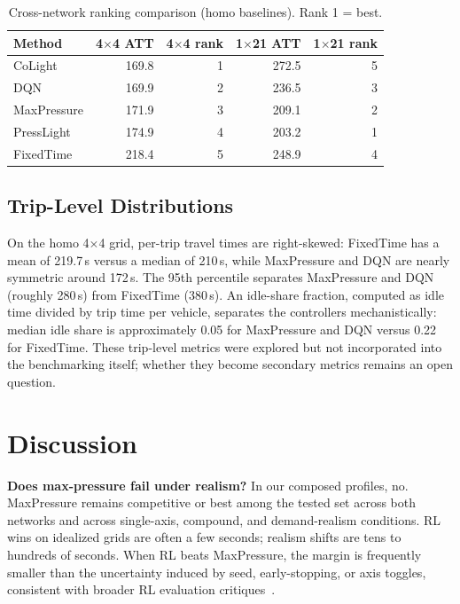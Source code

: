 \documentclass[conference]{IEEEtran}
\begin{document}
\begin{table}[t]
\centering
\caption{Cross-network ranking comparison (homo baselines). Rank 1 = best.}
\label{tab:crossnet}
\setlength{\tabcolsep}{4pt}
\begin{tabular}{lrrrr}
\toprule
Method & 4$\times$4 ATT & 4$\times$4 rank & 1$\times$21 ATT & 1$\times$21 rank \\
\midrule
CoLight     & 169.8 & 1 & 272.5 & 5 \\
DQN         & 169.9 & 2 & 236.5 & 3 \\
MaxPressure & 171.9 & 3 & 209.1 & 2 \\
PressLight  & 174.9 & 4 & 203.2 & 1 \\
FixedTime   & 218.4 & 5 & 248.9 & 4 \\
\bottomrule
\end{tabular}
\end{table}

\subsection{Trip-Level Distributions}

On the homo 4$\times$4 grid, per-trip travel times are right-skewed: FixedTime has a mean of 219.7\,s versus a median of 210\,s, while MaxPressure and DQN are nearly symmetric around 172\,s. The 95th percentile separates MaxPressure and DQN (roughly 280\,s) from FixedTime (380\,s). An idle-share fraction, computed as idle time divided by trip time per vehicle, separates the controllers mechanistically: median idle share is approximately 0.05 for MaxPressure and DQN versus 0.22 for FixedTime. These trip-level metrics were explored but not incorporated into the benchmarking itself; whether they become secondary metrics remains an open question.

\section{Discussion}

\textbf{Does max-pressure fail under realism?} In our composed profiles, no. MaxPressure remains competitive or best among the tested set across both networks and across single-axis, compound, and demand-realism conditions. RL wins on idealized grids are often a few seconds; realism shifts are tens to hundreds of seconds. When RL beats MaxPressure, the margin is frequently smaller than the uncertainty induced by seed, early-stopping, or axis toggles, consistent with broader RL evaluation critiques~\cite{henderson2018matters, agarwal2021rliable}.
\end{document}
